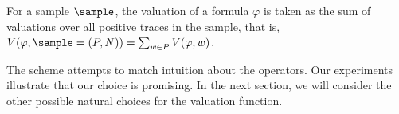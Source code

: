 For a sample $\sample$, the valuation of a formula $\varphi$ is taken as the sum of valuations over all positive traces in the sample, that is,
 $ V(\varphi, \sample = (P, N)) = \sum_{w \in P}^{} V(\varphi, w)$.

The scheme attempts to match intuition about the operators.
%
Our experiments illustrate that our choice is promising.
%
In the next section, we will consider the other possible natural choices
for the valuation function.
%



